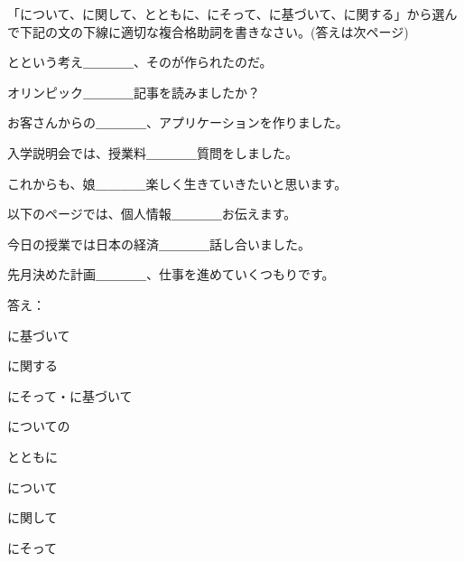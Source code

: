 
\author{Marko Miličić,Željka Ludošan}



		
	\begin{mondai}{「について、に関して、とともに、にそって、に基づいて、に関する」から選んで下記の文の下線に適切な複合格助詞を書きなさい。(答えは次ページ)}
		\item {}とという考え＿＿＿＿、そのが作られたのだ。	
		\item オリンピック＿＿＿＿記事を読みましたか？	
		\item お客さんからの＿＿＿＿、アプリケーションを作りました。
		\item 入学説明会では、授業料＿＿＿＿質問をしました。
		\item これからも、娘＿＿＿＿楽しく生きていきたいと思います。
		\item 以下のページでは、個人情報＿＿＿＿お伝えます。
		\item 今日の授業では日本の経済＿＿＿＿話し合いました。
		\item 先月決めた計画＿＿＿＿、仕事を進めていくつもりです。
	\end{mondai}
	
	\newpage
	\begin{mondai}{答え：}
		\item に基づいて
		\item に関する
		\item にそって・に基づいて
		\item についての
		\item とともに
		\item について
		\item に関して
		\item にそって
		

	\end{mondai}
	


